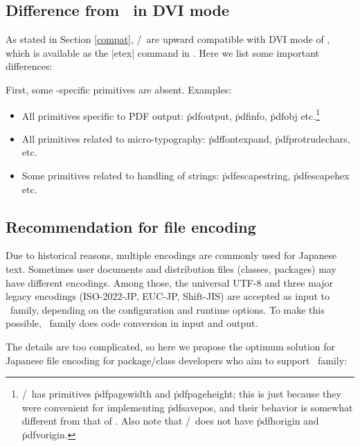 \documentclass[a4paper,11pt,dvipdfmx]{article}
\let\emph=\origemph
\begin{document}
\subsection{Difference from \pdfTeX\ in DVI mode}\label{dvi-pdftex}

As stated in Section \ref{compat}, \epTeX/\eupTeX\ are
\emph{not} upward compatible with DVI mode of \pdfTeX,
which is available as the |etex| command in \TL.
Here we list some important differences:

First, some \pdfTeX-specific primitives are absent. Examples:
\begin{itemize}
 \item All primitives specific to PDF output:
   \.{pdfoutput}, \.{pdfinfo}, \.{pdfobj} etc.\footnote{%
    \epTeX/\eupTeX\ has primitives \.{pdfpagewidth} and \.{pdfpageheight};
    this is just because they were convenient for implementing \.{pdfsavepos},
    and their behavior is somewhat different from that of \pdfTeX.
    Also note that \epTeX/\eupTeX\ does not have \.{pdfhorigin}
    and \.{pdfvorigin}.}
 \item All primitives related to micro-typography:
   \.{pdffontexpand}, \.{pdfprotrudechars}, etc.
 \item Some primitives related to handling of strings:
   \.{pdfescapestring}, \.{pdfescapehex} etc.
\end{itemize}



\subsection{Recommendation for file encoding}\label{file-enc}

Due to historical reasons,
multiple encodings are commonly used for Japanese text.
Sometimes user documents and distribution files (classes, packages)
may have different encodings.
Among those, the universal UTF-8 and
three major legacy encodings (ISO-2022-JP, EUC-JP, Shift-JIS)
are accepted as input to \pTeX\ family,
depending on the configuration and runtime options.
To make this possible,
\pTeX\ family does code conversion in input and output.

The details are too complicated, so here we propose
the optimum solution for Japanese file encoding
for package/class developers who aim to support \pTeX\ family:
\end{document}
